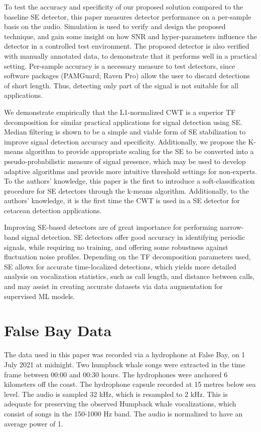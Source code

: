 To test the accuracy and specificity of our proposed solution compared to the baseline SE detector, 
this paper measures detector performance on a per-sample basis on the audio. Simulation is used to verify 
and design the proposed technique, and gain some insight on how SNR and hyper-parameters influence the detector in a 
controlled test environment. The proposed detector is also verified with manually annotated data, to demonstrate that 
it performs well in a practical setting. Per-sample accuracy is a necessary measure to test detectors, since software packages (PAMGuard; Raven Pro) 
allow the user to discard detections of short length. Thus, detecting only part of the signal is not suitable for all applications.

We demonstrate empirically that the L1-normalized CWT is a superior 
TF decomposition for similar practical applications for signal detection using SE. 
Median filtering is shown to be a simple and viable form of SE stabilization to improve 
signal detection accuracy and specificity. Additionally, we propose the K-means algorithm 
to provide appropriate scaling for the SE to be converted into a pseudo-probabilistic measure 
of signal presence, which may be used to develop adaptive algorithms and provide more intuitive 
threshold settings for non-experts. To the authors' knowledge, this paper is the first to introduce a 
soft-classification procedure for SE detectors through the k-means algorithm. Additionally, to the authors' knowledge, 
it is the first time the CWT is used in a SE detector for cetacean detection applications.

Improving SE-based detectors are of great importance for performing narrow-band signal detection. 
SE detectors offer good accuracy in identifying periodic signals, while requiring no training, and offering 
some robustness against fluctuation noise profiles. Depending on the TF decomposition parameters used, 
SE allows for accurate time-localized detections, which yields more detailed analysis on vocalization statistics, 
such as call length, and distance between calls, and may assist in creating accurate datasets via data augmentation for supervised ML models.

\section{False Bay Data}
The data used in this paper was recorded via a hydrophone at False Bay, on 1 July 2021 at midnight. Two humpback whale songs were extracted in the time frame between 00:00 and 00:30 hours. The hydrophones were anchored 6 kilometers off the coast. The hydrophone capsule recorded at 15 metres below sea level. The audio is sampled 32 kHz, which is resampled to 2 kHz. This is adequate for preserving the observed Humpback whale vocalizations, which consist of songs in the 150-1000 Hz band. The audio is normalized to have an average power of 1.


